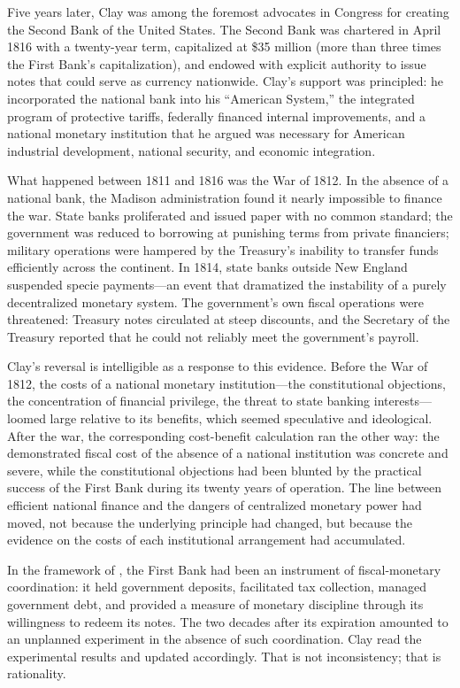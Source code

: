 \documentclass[12pt]{article}
\begin{document}
Five years later, Clay was among the foremost advocates in Congress
for creating the Second Bank of the United States.  The Second Bank was
chartered in April 1816 with a twenty-year term, capitalized at \$35
million (more than three times the First Bank's capitalization), and
endowed with explicit authority to issue notes that could serve as
currency nationwide.  Clay's support was principled: he incorporated the national bank into his
``American System,'' the integrated program of protective tariffs,
federally financed internal improvements, and a national monetary
institution that he argued was necessary for American industrial
development, national security, and economic integration.

What happened between 1811 and 1816 was the War of 1812.  In the
absence of a national bank, the Madison administration found it nearly
impossible to finance the war.  State banks proliferated and issued paper
with no common standard; the government was reduced to borrowing at
punishing terms from private financiers; military operations were
hampered by the Treasury's inability to transfer funds efficiently across
the continent.  In 1814, state banks outside New England suspended specie
payments---an event that dramatized the instability of a purely
decentralized monetary system.  The government's own fiscal operations
were threatened: Treasury notes circulated at steep discounts, and the
Secretary of the Treasury reported that he could not reliably meet
the government's payroll.

Clay's reversal is intelligible as a response to this evidence.  Before
the War of 1812, the costs of a national monetary institution---the
constitutional objections, the concentration of financial privilege, the
threat to state banking interests---loomed large relative to its
benefits, which seemed speculative and ideological.  After the war, the
corresponding cost-benefit calculation ran the other way: the
demonstrated fiscal cost of the absence of a national institution was
concrete and severe, while the constitutional objections had been blunted
by the practical success of the First Bank during its twenty years of
operation.  The line between efficient national finance and the dangers
of centralized monetary power had moved, not because the underlying
principle had changed, but because the evidence on the costs of each
institutional arrangement had accumulated.

In the framework of \citet{Sargent2011}, the First Bank had been an
instrument of fiscal-monetary coordination: it held government deposits,
facilitated tax collection, managed government debt, and provided a
measure of monetary discipline through its willingness to redeem its
notes.  The two decades after its expiration amounted to an unplanned
experiment in the absence of such coordination.  Clay read the
experimental results and updated accordingly.  That is not inconsistency;
that is rationality.
\end{document}
